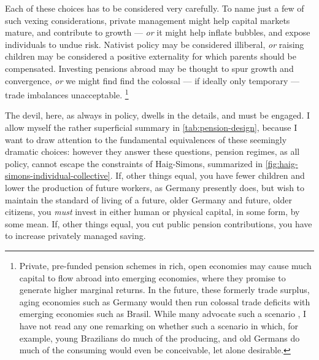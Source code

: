 
Each of these choices has to be considered very carefully.
To name just a few of such vexing considerations, private management might help capital markets mature, and contribute to growth \citep[for example][155]{Barr2005a} --- \emph{or} it might help inflate bubbles, and expose individuals to undue risk.
Nativist policy may be considered illiberal, \emph{or} raising children may be considered a positive externality for which parents should be compensated.
Investing pensions abroad may be thought to spur growth and convergence, \emph{or} we might find find the colossal --- if ideally only temporary --- trade imbalances unacceptable.
\footnote{
	Private, pre-funded pension schemes in rich, open economies may cause much capital to flow abroad into emerging economies, where they promise to generate higher marginal returns.
	In the future, these formerly trade surplus, aging economies such as Germany would then run colossal trade deficits with emerging economies such as Brasil.
	While many advocate such a scenario \citep[for example,][176]{Borsch-Supan2003}, I have not read any one remarking on whether such a scenario in which, for example, young Brazilians do much of the producing, and old Germans do much of the consuming would even be conceivable, let alone desirable.
}

The devil, here, as always in policy, dwells in the details, and must be engaged.
I allow myself the rather superficial summary in \autoref{tab:pension-design}, because I want to draw attention to the fundamental equivalences of these seemingly dramatic choices:
however they answer these questions, pension regimes, as all policy, cannot escape the constraints of Haig-Simons, summarized in \autoref{fig:haig-simons-individual-collective}.
If, other things equal, you have fewer children and lower the production of future workers, as Germany presently does, but wish to maintain the standard of living of a future, older Germany and future, older citizens, you \emph{must} invest in either human or physical capital, in some form, by some mean.
If,  other things equal, you cut public pension contributions, you have to increase privately managed saving.


